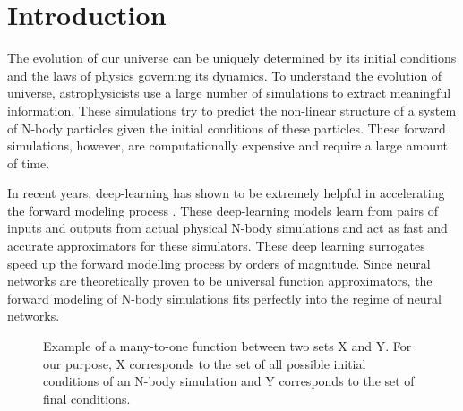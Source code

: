 \documentclass[10pt]{article}
\begin{document}
\section{Introduction}

The evolution of our universe can be uniquely determined by its initial conditions and the laws of physics governing its dynamics. To understand the evolution of  universe, astrophysicists use a large number of simulations to extract meaningful information. These simulations try to predict the non-linear structure of a system of N-body particles given the initial conditions of these particles. These forward simulations, however, are computationally expensive and require a large amount of time.

In recent years, deep-learning has shown to be extremely helpful in accelerating the forward modeling process \cite{he_li_feng_ho_ravanbakhsh_chen_póczos_2019}. These deep-learning models learn from pairs of inputs and outputs from actual physical N-body simulations and act as fast and accurate approximators for these simulators. These deep learning surrogates speed up the forward modelling process by orders of magnitude. Since neural networks are theoretically proven to be universal function approximators, the forward modeling of N-body simulations fits perfectly into the regime of neural networks.

\begin{figure}
    \caption{Example of a many-to-one function between two sets X and Y. For our purpose, X corresponds to the set of all possible initial conditions of an N-body simulation and Y corresponds to the set of final conditions.}
    \label{manytoone}
\end{figure}
\end{document}
